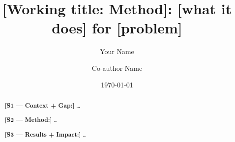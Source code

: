 \documentclass[11pt]{article}
\title{\bfseries [Working title: Method]: [what it does] for [problem]}
\author{Your Name \and Co-author Name}
\date{\today}
\begin{document}
\maketitle

\begin{abstract}
\textbf{[S1 — Context + Gap:]} \dots

\textbf{[S2 — Method:]} \dots

\textbf{[S3 — Results + Impact:]} \dots
\end{abstract}

\end{document}
